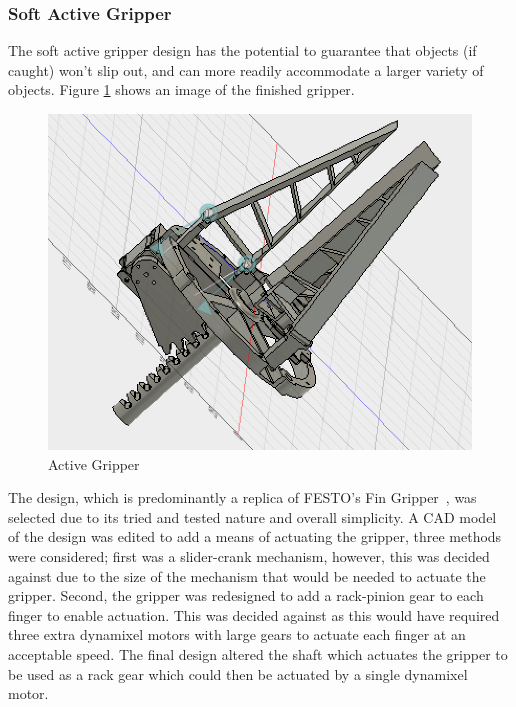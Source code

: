 \documentclass[conference]{IEEEtran}
\begin{document}
\subsubsection{Soft Active Gripper}
The soft active gripper design has the potential to guarantee that objects (if caught) won’t slip out, and can more readily accommodate a larger variety of objects. Figure \ref{active_gripper} shows an image of the finished gripper.
\begin{figure}\label{active_gripper}
\centering
\includegraphics[scale=0.24]{active_gripper.png}
\caption{Active Gripper}
\end{figure}
The design, which is predominantly a replica of FESTO’s Fin Gripper~\cite{festofin}, was selected due to its tried and tested nature and overall simplicity. A CAD model of the design was edited to add a means of actuating the gripper, three methods were considered; first was a slider-crank mechanism, however, this was decided against due to the size of the mechanism that would be needed to actuate the gripper. Second, the gripper was redesigned to add a rack-pinion gear to each finger to enable actuation. This was decided against as this would have required three extra dynamixel motors with large gears to actuate each finger at an acceptable speed. The final design altered the shaft which actuates the gripper to be used as a rack gear which could then be actuated by a single dynamixel motor.
\end{document}

